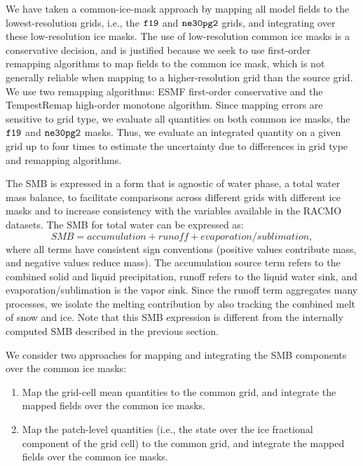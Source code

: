 \documentclass[draft]{agujournal2019}
\begin{document}
We have taken a common-ice-mask approach by mapping all model fields to the lowest-resolution grids, i.e., the $\tt f19$ and $\tt ne30pg2$ grids, and integrating over these low-resolution ice masks. The use of low-resolution common ice masks is a conservative decision, and is justified because we seek to use first-order remapping algorithms to map fields to the common ice mask, which is not generally reliable when mapping to a higher-resolution grid than the source grid. We use two remapping algorithms: ESMF first-order conservative and the TempestRemap \cite{TempestRemap} high-order monotone algorithm. Since mapping errors are sensitive to grid type, we evaluate all quantities on both common ice masks, the $\tt f19$ and $\tt ne30pg2$ masks. Thus, we evaluate an integrated quantity on a given grid up to four times to estimate the uncertainty due to differences in grid type and remapping algorithms.

The SMB is expressed in a form that is agnostic of water phase, a total water mass balance, to facilitate comparisons across different grids with different ice masks and to increase consistency with the variables available in the RACMO datasets. The SMB for total water can be expressed as:
\begin{equation}
SMB = accumulation + runoff + evaporation/sublimation, \label{eq:SMB}
\end{equation}
where all terms have consistent sign conventions (positive values contribute mass, and negative values reduce mass). The accumulation source term refers to the combined solid and liquid precipitation, runoff refers to the liquid water sink, and evaporation/sublimation is the vapor sink. Since the runoff term aggregates many processes, we isolate the melting contribution by also tracking the combined melt of snow and ice. Note that this SMB expression is different from the internally computed SMB described in the previous section.

We consider two approaches for mapping and integrating the SMB components over the common ice masks:
\begin{enumerate}
\item Map the grid-cell mean quantities to the common grid, and integrate the mapped fields over the common ice masks. \label{lbl:label1}
\item Map the patch-level quantities (i.e., the state over the ice fractional component of the grid cell) to the common grid, and integrate the mapped fields over the common ice masks. \label{lbl:label2}
\end{enumerate}
\end{document}
